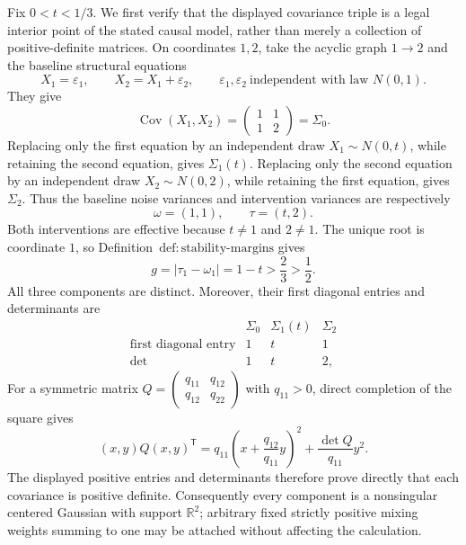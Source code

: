 Fix \(0<t<1/3\).  We first verify that the displayed covariance triple is a legal interior point of the stated causal model, rather than merely a collection of positive-definite matrices.  On coordinates \(1,2\), take the acyclic graph \(1\mathbin{\to}2\) and the baseline structural equations
\[
 X_1=\varepsilon_1,\qquad X_2=X_1+\varepsilon_2,
 \qquad \varepsilon_1,\varepsilon_2\ \text{independent with law }N(0,1).
\]
They give
\[
 \operatorname{Cov}(X_1,X_2)
 =\begin{pmatrix}1&1\\1&2\end{pmatrix}=\Sigma_0.
\]
Replacing only the first equation by an independent draw \(X_1\sim N(0,t)\), while retaining the second equation, gives \(\Sigma_1(t)\).  Replacing only the second equation by an independent draw \(X_2\sim N(0,2)\), while retaining the first equation, gives \(\Sigma_2\).  Thus the baseline noise variances and intervention variances are respectively
\[
 \omega=(1,1),\qquad \tau=(t,2).
\]
Both interventions are effective because \(t\ne1\) and \(2\ne1\).  The unique root is coordinate \(1\), so Definition~\(\mathrm{def:stability\text{-}margins}\) gives
\[
 g=|\tau_1-\omega_1|=1-t>\frac23>\frac12.
\]
All three components are distinct.  Moreover, their first diagonal entries and determinants are
\[
 \begin{array}{c|ccc}
  &\Sigma_0&\Sigma_1(t)&\Sigma_2\\ \hline
 \text{first diagonal entry}&1&t&1\\
 \det&1&t&2,
 \end{array}
\]
For a symmetric matrix \(Q=\left(\begin{smallmatrix}q_{11}&q_{12}\\q_{12}&q_{22}\end{smallmatrix}\right)\) with \(q_{11}>0\), direct completion of the square gives
\[
 (x,y)Q(x,y)^{\mathsf T}
 =q_{11}\left(x+\frac{q_{12}}{q_{11}}y\right)^2
  +\frac{\det Q}{q_{11}}y^2.
\]
The displayed positive entries and determinants therefore prove directly that each covariance is positive definite.  Consequently every component is a nonsingular centered Gaussian with support \(\mathbb R^2\); arbitrary fixed strictly positive mixing weights summing to one may be attached without affecting the calculation.

